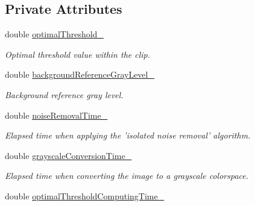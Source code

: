 \subsection*{Private Attributes}
\begin{CompactItemize}
\item 
\hypertarget{class_preprocessor_c60092b388e44bd15d34e49c63e4f489}{
double \hyperlink{class_preprocessor_c60092b388e44bd15d34e49c63e4f489}{optimalThreshold\_\-}}
\label{class_preprocessor_c60092b388e44bd15d34e49c63e4f489}

\begin{CompactList}\small\item\em Optimal threshold value within the clip. \item\end{CompactList}\item 
\hypertarget{class_preprocessor_7a2ed1dcdde4903c6a1260173d61a364}{
double \hyperlink{class_preprocessor_7a2ed1dcdde4903c6a1260173d61a364}{backgroundReferenceGrayLevel\_\-}}
\label{class_preprocessor_7a2ed1dcdde4903c6a1260173d61a364}

\begin{CompactList}\small\item\em Background reference gray level. \item\end{CompactList}\item 
\hypertarget{class_preprocessor_386a5118bd982b2377c1fc5d67ebb7ac}{
double \hyperlink{class_preprocessor_386a5118bd982b2377c1fc5d67ebb7ac}{noiseRemovalTime\_\-}}
\label{class_preprocessor_386a5118bd982b2377c1fc5d67ebb7ac}

\begin{CompactList}\small\item\em Elapsed time when applying the 'isolated noise removal' algorithm. \item\end{CompactList}\item 
\hypertarget{class_preprocessor_63ee491e6b8bc09fc79aeb6d68a8c4d3}{
double \hyperlink{class_preprocessor_63ee491e6b8bc09fc79aeb6d68a8c4d3}{grayscaleConversionTime\_\-}}
\label{class_preprocessor_63ee491e6b8bc09fc79aeb6d68a8c4d3}

\begin{CompactList}\small\item\em Elapsed time when converting the image to a grayscale colorspace. \item\end{CompactList}\item 
\hypertarget{class_preprocessor_d606fe1f0be7f7be60583f59278e2df6}{
double \hyperlink{class_preprocessor_d606fe1f0be7f7be60583f59278e2df6}{optimalThresholdComputingTime\_\-}}
\label{class_preprocessor_d606fe1f0be7f7be60583f59278e2df6}


\end{CompactItemize}
